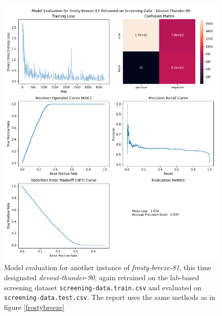\documentclass[16pt]{book}
\begin{document}
\begin{figure}
	\caption{\label{devoutthunder} Model evaluation for another instance of \textit{frosty-breeze-81}, this time designated \textit{devout-thunder-90}, again retrained on the lab-based screening dataset \texttt{screening-data.train.csv} and evaluated on \texttt{screening-data.test.csv}. The report uses the same methods as in figure \ref{frostybreeze}}
	\includegraphics[width = \textwidth]{img/frosty-breeze-83-vivid-breeze-91-devout-thunder-90-eval.png}
\end{figure}
\end{document}
